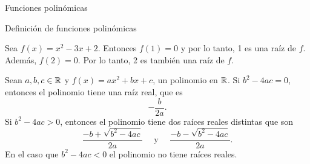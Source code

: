 \begin{chapter}{Funciones polinómicas}
\begin{section}{Definición de funciones polinómicas}
        \begin{ejemplo*}
            Sea $f (x) = x^2 - 3x + 2$. Entonces $f(1)=0$ y por lo tanto, 1 es una raíz de $f$.
            Además, $f (2) = 0$. Por lo tanto, 2 es también una raíz de $f$.
        \end{ejemplo*}
    
        \begin{ejemplo*}
            Sean $a,b,c \in \mathbb R$ y  $f(x) = ax^2 + bx + c$, un polinomio en $\mathbb R$.  Si $b^2 - 4 ac = 0$, entonces el polinomio tiene una raíz real, que es
            \begin{equation*}
                -\frac{b}{2a}.
            \end{equation*}
            Si $b^2 - 4 ac > 0$, entonces el polinomio tiene dos raíces reales distintas que son
            \begin{equation*}
                \frac{-b + \sqrt{b^2 - 4 ac}}{2a}\quad \text{ y }\quad \frac{-b - \sqrt{b^2 - 4 ac}}{2a}. 
            \end{equation*}
            En el caso que $b^2 - 4 ac < 0$ el polinomio no tiene raíces reales. 
        \end{ejemplo*}
        

\end{section}
\end{chapter}
